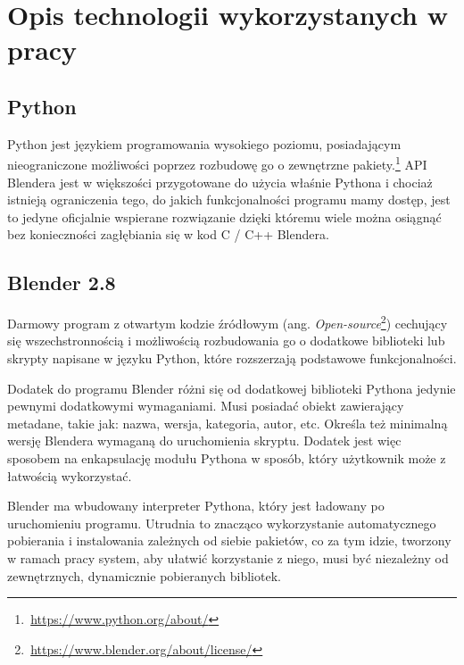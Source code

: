 \documentclass{xmgr}
\begin{document}
\newpage

\section {Opis technologii wykorzystanych w pracy}

\subsection{Python}
Python jest językiem programowania wysokiego poziomu, posiadającym nieograniczone możliwości poprzez rozbudowę go o zewnętrzne pakiety.\footnote {\,\url{https://www.python.org/about/}} API Blendera jest w większości przygotowane do użycia właśnie Pythona i chociaż istnieją ograniczenia tego, do jakich funkcjonalności programu mamy dostęp, jest to jedyne oficjalnie wspierane rozwiązanie dzięki któremu wiele można osiągnąć bez konieczności zagłębiania się w kod C / C++ Blendera.

\subsection {Blender 2.8}
Darmowy program z otwartym kodzie źródłowym (ang. \emph{Open-source}\footnote{\,\url{https://www.blender.org/about/license/}}) cechujący się wszechstronnością i możliwością rozbudowania go o dodatkowe biblioteki lub skrypty napisane w języku Python, które rozszerzają podstawowe funkcjonalności.

Dodatek do programu Blender różni się od dodatkowej biblioteki Pythona jedynie pewnymi dodatkowymi wymaganiami. Musi posiadać obiekt zawierający metadane, takie jak: nazwa, wersja, kategoria, autor, etc. Określa też minimalną wersję Blendera wymaganą do uruchomienia skryptu. Dodatek jest więc sposobem na enkapsulację modułu Pythona w sposób, który użytkownik może z łatwością wykorzystać.

Blender ma wbudowany interpreter Pythona, który jest ładowany po uruchomieniu programu. Utrudnia to znacząco wykorzystanie automatycznego pobierania i instalowania zależnych od siebie pakietów, co za tym idzie, tworzony w ramach pracy system, aby ułatwić korzystanie z niego, musi być niezależny od zewnętrznych, dynamicznie pobieranych bibliotek.
\end{document}
